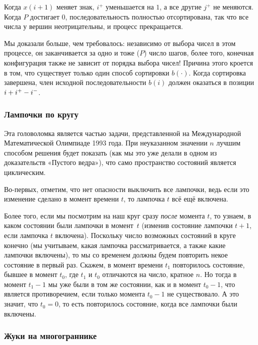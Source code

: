 Когда $x(i+1)$ меняет знак, $i^+$ уменьшается на $1$, а все другие $j^+$ не меняются.
Когда $P$ достигает $0$, последовательность полностью отсортирована, так что все числа у вершин неотрицательны, и процесс прекращается.

Мы доказали больше, чем требовалось:
независимо от выбора чисел в этом процессе, он заканчивается за одно и тоже ($P$) число шагов,
более того, конечная конфигурация также не зависит от порядка выбора чисел!
Причина этого кроется в том, что существует только один способ сортировки $b(\cdot)$.
Когда сортировка завершена, член исходной последовательности $b(i)$ должен оказаться в позиции $i \z+ i^+ - i^-$.
\heart

\subsubsection*{Лампочки по кругу}%

Эта головоломка является частью задачи, представленной на Международной Математической Олимпиаде 1993 года.
При неуказанном значении $n$ лучшим способом решения будет показать (как мы это уже делали в одном из доказательств «Пустого ведра»), что само пространство состояний является циклическим.

\medskip

Во-первых, отметим, что нет опасности выключить все лампочки,
ведь если это изменение сделано в момент времени $t$, то лампочка $t$ всё ещё включена.

Более того, если мы посмотрим на наш круг сразу \emph{после} момента $t$, то узнаем, в каком состоянии были лампочки в момент~$t$ (изменив состояние лампочки $t+1$, если лампочка $t$ включена).
Поскольку число возможных состояний в круге конечно (мы учитываем, какая лампочка рассматривается, а также какие лампочки включены), то мы со временем должны будем повторить некое состояние в первый раз.
Скажем, в момент времени $t_1$ повторилось состояние, бывшее в момент $t_0$, где $t_1$ и $t_0$ отличаются на число, кратное $n$.
Но тогда в момент $t_1 - 1$ мы уже были в том же состоянии, как и в момент $t_0 - 1$, что является противоречием, если только момента $t_0 - 1$ не существовало.
А это значит, что $t_0=0$, то есть повторилось состояние, когда все лампочки были включены.
\heart

\subsubsection*{Жуки на многограннике}%

